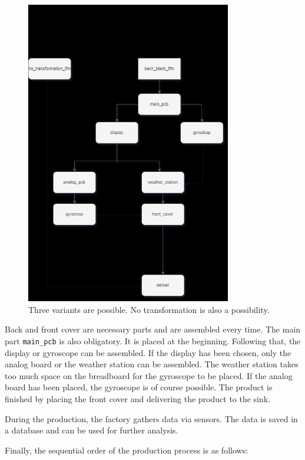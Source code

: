 \begin{figure}[htbp]
  \centering
  \includegraphics[width=0.8\textwidth]{figures/assrules.png}
  \caption{Three variants are possible. No transformation is also a possibility.}
  \label{fig:assrules}
\end{figure}

Back and front cover are necessary parts and are assembled every time. The main part \texttt{main\_pcb} is also obligatory. It is placed at the beginning. Following that, the display or gyroscope can be assembled. If the display has been chosen, only the analog board or the weather station can be assembled. The weather station takes too much space on the breadboard for the gyroscope to be placed. If the analog board has been placed, the gyroscope is of course possible. The product is finished by placing the front cover and delivering the product to the sink.

During the production, the factory gathers data via sensors. The data is saved in a database and can be used for further analysis.

Finally, the sequential order of the production process is as follows:

